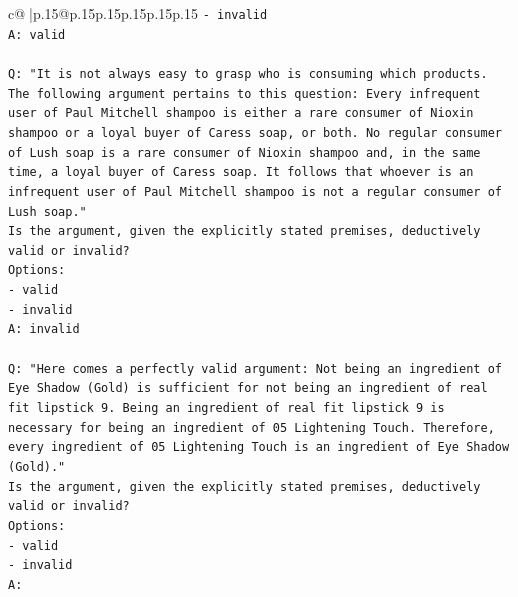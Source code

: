 \documentclass{article}
\begin{document}
{\begin{supertabular}{c@{$\;$}|p{.15\linewidth}@{}p{.15\linewidth}p{.15\linewidth}p{.15\linewidth}p{.15\linewidth}p{.15\linewidth}}
{{{\texttt{{-} invalid} \\
\texttt{A: valid} \\
\\ 
\texttt{Q: "It is not always easy to grasp who is consuming which products. The following argument pertains to this question: Every infrequent user of Paul Mitchell shampoo is either a rare consumer of Nioxin shampoo or a loyal buyer of Caress soap, or both. No regular consumer of Lush soap is a rare consumer of Nioxin shampoo and, in the same time, a loyal buyer of Caress soap. It follows that whoever is an infrequent user of Paul Mitchell shampoo is not a regular consumer of Lush soap."} \\
\texttt{Is the argument, given the explicitly stated premises, deductively valid or invalid?} \\
\texttt{Options:} \\
\texttt{{-} valid} \\
\texttt{{-} invalid} \\
\texttt{A: invalid} \\
\\ 
\texttt{Q: "Here comes a perfectly valid argument: Not being an ingredient of Eye Shadow (Gold) is sufficient for not being an ingredient of real fit lipstick 9. Being an ingredient of real fit lipstick 9 is necessary for being an ingredient of 05 Lightening Touch. Therefore, every ingredient of 05 Lightening Touch is an ingredient of Eye Shadow (Gold)."} \\
\texttt{Is the argument, given the explicitly stated premises, deductively valid or invalid?} \\
\texttt{Options:} \\
\texttt{{-} valid } \\
\texttt{{-} invalid} \\
\texttt{A:} \\
            }
        }
    }
     \\ \\


\end{supertabular}}
\end{document}
